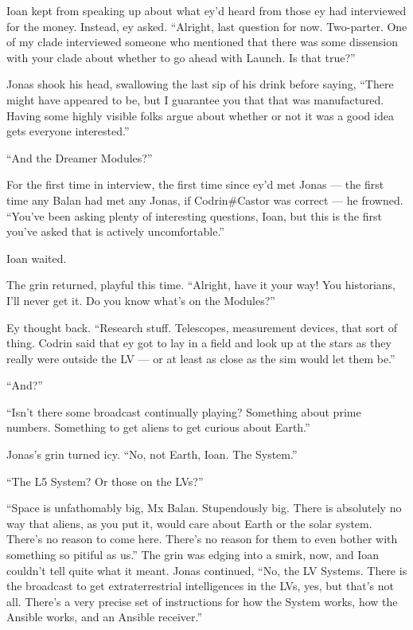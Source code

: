 Ioan kept from speaking up about what ey'd heard from those ey had interviewed for the money. Instead, ey asked. ``Alright, last question for now. Two-parter. One of my clade interviewed someone who mentioned that there was some dissension with your clade about whether to go ahead with Launch. Is that true?''

Jonas shook his head, swallowing the last sip of his drink before saying, ``There might have appeared to be, but I guarantee you that that was manufactured. Having some highly visible folks argue about whether or not it was a good idea gets everyone interested.''

``And the Dreamer Modules?''

For the first time in interview, the first time since ey'd met Jonas — the first time any Balan had met any Jonas, if Codrin\#Castor was correct — he frowned. ``You've been asking plenty of interesting questions, Ioan, but this is the first you've asked that is actively uncomfortable.''

Ioan waited.

The grin returned, playful this time. ``Alright, have it your way! You historians, I'll never get it. Do you know what's on the Modules?''

Ey thought back. ``Research stuff. Telescopes, measurement devices, that sort of thing. Codrin said that ey got to lay in a field and look up at the stars as they really were outside the LV — or at least as close as the sim would let them be.''

``And?''

``Isn't there some broadcast continually playing? Something about prime numbers. Something to get aliens to get curious about Earth.''

Jonas's grin turned icy. ``No, not Earth, Ioan. The System.''

``The L5 System? Or those on the LVs?''

``Space is unfathomably big, Mx Balan. Stupendously big. There is absolutely no way that aliens, as you put it, would care about Earth or the solar system. There's no reason to come here. There's no reason for them to even bother with something so pitiful as us.'' The grin was edging into a smirk, now, and Ioan couldn't tell quite what it meant. Jonas continued, ``No, the LV Systems. There is the broadcast to get extraterrestrial intelligences in the LVs, yes, but that's not all. There's a very precise set of instructions for how the System works, how the Ansible works, and an Ansible receiver.''

